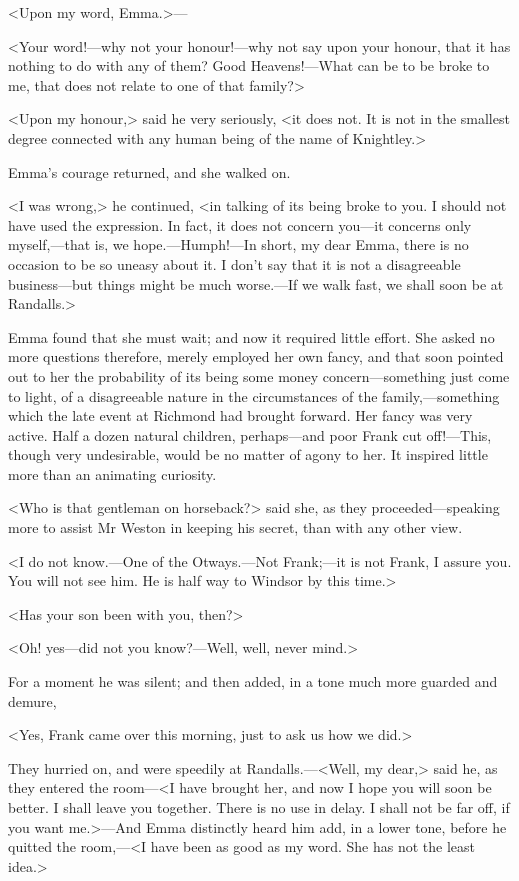 <Upon my word, Emma.>—

<Your word!—why not your honour!—why not say upon your honour, that it has nothing to do with any of them? Good Heavens!—What can be to be broke to me, that does not relate to one of that family?>

<Upon my honour,> said he very seriously, <it does not. It is not in the smallest degree connected with any human being of the name of Knightley.>

Emma's courage returned, and she walked on.

<I was wrong,> he continued, <in talking of its being broke to you. I should not have used the expression. In fact, it does not concern you—it concerns only myself,—that is, we hope.—Humph!—In short, my dear Emma, there is no occasion to be so uneasy about it. I don't say that it is not a disagreeable business—but things might be much worse.—If we walk fast, we shall soon be at Randalls.>

Emma found that she must wait; and now it required little effort. She asked no more questions therefore, merely employed her own fancy, and that soon pointed out to her the probability of its being some money concern—something just come to light, of a disagreeable nature in the circumstances of the family,—something which the late event at Richmond had brought forward. Her fancy was very active. Half a dozen natural children, perhaps—and poor Frank cut off!—This, though very undesirable, would be no matter of agony to her. It inspired little more than an animating curiosity.

<Who is that gentleman on horseback?> said she, as they proceeded—speaking more to assist Mr Weston in keeping his secret, than with any other view.

<I do not know.—One of the Otways.—Not Frank;—it is not Frank, I assure you. You will not see him. He is half way to Windsor by this time.>

<Has your son been with you, then?>

<Oh! yes—did not you know?—Well, well, never mind.>

For a moment he was silent; and then added, in a tone much more guarded and demure,

<Yes, Frank came over this morning, just to ask us how we did.>

They hurried on, and were speedily at Randalls.—<Well, my dear,> said he, as they entered the room—<I have brought her, and now I hope you will soon be better. I shall leave you together. There is no use in delay. I shall not be far off, if you want me.>—And Emma distinctly heard him add, in a lower tone, before he quitted the room,—<I have been as good as my word. She has not the least idea.>

